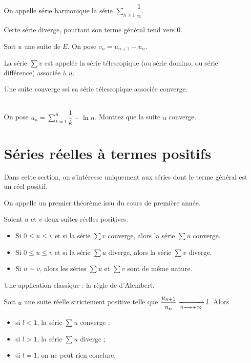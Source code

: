 \begin{ex}
On appelle série harmonique la série \(\sum_{n\geq1}\dfrac{1}{n}\).

Cette série diverge, pourtant son terme général tend vers \(0\).
\end{ex}

\begin{defi}
Soit \(u\) une suite de \(E\). On pose \(v_n=u_{n+1}-u_n\).

La série \(\sum v\) est appelée la série télescopique (ou série domino, ou série différence) associée à \(u\).
\end{defi}

\begin{prop}
Une suite converge ssi sa série télescopique associée converge.
\end{prop}

\begin{exo}~\\
On pose \(u_n=\sum_{k=1}^n\dfrac{1}{k}-\ln n\). Montrez que la suite \(u\) converge.
\end{exo}

\section{Séries réelles à termes positifs}

Dans cette section, on s'intéresse uniquement aux séries dont le terme général est un réel positif.

On appelle un premier théorème issu du cours de première année.

\begin{theo}
Soient \(u\) et \(v\) deux suites réelles positives.

\begin{itemize}
    \item Si \(0\leq u\leq v\) et si la série \(\sum v\) converge, alors la série \(\sum u\) converge. \\
    \item Si \(0\leq u\leq v\) et si la série \(\sum u\) diverge, alors la série \(\sum v\) diverge. \\
    \item Si \(u\sim v\), alors les séries \(\sum u\) et \(\sum v\) sont de même nature.
\end{itemize}
\end{theo}

Une application classique : la règle de d'Alembert.

\begin{prop}
Soit \(u\) une suite réelle strictement positive telle que \(\dfrac{u_{n+1}}{u_n}\xrightarrow[n\longrightarrow+\infty]{}l\). Alors

\begin{itemize}
    \item si \(l<1\), la série \(\sum u\) converge ; \\
    \item si \(l>1\), la série \(\sum u\) diverge ; \\
    \item si \(l=1\), on ne peut rien conclure.
\end{itemize}
\end{prop}

